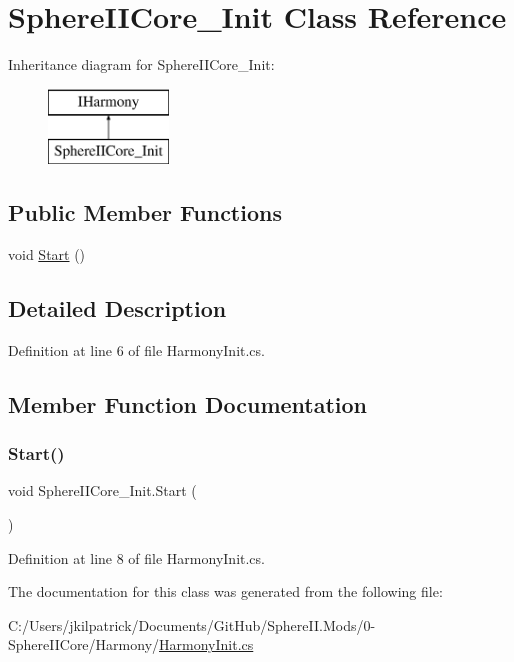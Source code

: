 \hypertarget{class_sphere_i_i_core___init}{}\section{Sphere\+I\+I\+Core\+\_\+\+Init Class Reference}
\label{class_sphere_i_i_core___init}
Inheritance diagram for Sphere\+I\+I\+Core\+\_\+\+Init\+:\begin{figure}[H]
\begin{center}
\leavevmode
\includegraphics[height=2.000000cm]{de/d40/class_sphere_i_i_core___init}
\end{center}
\end{figure}
\subsection*{Public Member Functions}
\begin{DoxyCompactItemize}
\item 
void \mbox{\hyperlink{class_sphere_i_i_core___init_a87ad6a825d11618eb54f78fcfbfbda64}{Start}} ()
\end{DoxyCompactItemize}


\subsection{Detailed Description}


Definition at line 6 of file Harmony\+Init.\+cs.



\subsection{Member Function Documentation}
\mbox{\label{class_sphere_i_i_core___init_a87ad6a825d11618eb54f78fcfbfbda64}} 
\subsubsection{\texorpdfstring{Start()}{Start()}}
{\footnotesize\ttfamily void Sphere\+I\+I\+Core\+\_\+\+Init.\+Start (\begin{DoxyParamCaption}{ }\end{DoxyParamCaption})}



Definition at line 8 of file Harmony\+Init.\+cs.



The documentation for this class was generated from the following file\+:\begin{DoxyCompactItemize}
\item 
C\+:/\+Users/jkilpatrick/\+Documents/\+Git\+Hub/\+Sphere\+I\+I.\+Mods/0-\/\+Sphere\+I\+I\+Core/\+Harmony/\mbox{\hyperlink{0-_sphere_i_i_core_2_harmony_2_harmony_init_8cs}{Harmony\+Init.\+cs}}\end{DoxyCompactItemize}
